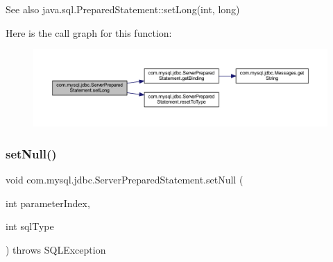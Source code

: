 \begin{DoxySeeAlso}{See also}
java.\+sql.\+Prepared\+Statement\+::set\+Long(int, long) 
\end{DoxySeeAlso}
Here is the call graph for this function\+:
\nopagebreak
\begin{figure}[H]
\begin{center}
\leavevmode
\includegraphics[width=350pt]{classcom_1_1mysql_1_1jdbc_1_1_server_prepared_statement_a5bedcb6eb68aadc6691bba3b63b5904a_cgraph}
\end{center}
\end{figure}
\mbox{\label{classcom_1_1mysql_1_1jdbc_1_1_server_prepared_statement_ad4e2103ca03ca7d468bcfb5bd4adc48e}} 
\subsubsection{\texorpdfstring{set\+Null()}{setNull()}\hspace{0.1cm}{\footnotesize\ttfamily [1/2]}}
{\footnotesize\ttfamily void com.\+mysql.\+jdbc.\+Server\+Prepared\+Statement.\+set\+Null (\begin{DoxyParamCaption}\item[{int}]{parameter\+Index,  }\item[{int}]{sql\+Type }\end{DoxyParamCaption}) throws S\+Q\+L\+Exception}

